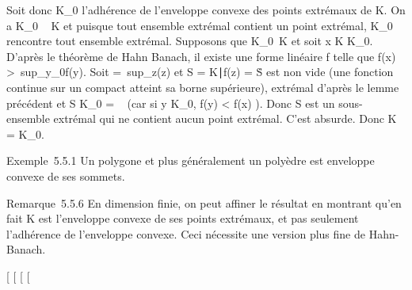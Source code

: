 \documentclass[]{article}
\begin{document}
Soit donc K_0 l'adhérence de l'enveloppe convexe des points
extrémaux de K. On a K_0 \subset~ K et puisque tout ensemble extrémal
contient un point extrémal, K_0 rencontre tout ensemble
extrémal. Supposons que K_0\neq~K et
soit x \in K \diagdown K_0. D'après le théorème de Hahn Banach, il existe
une forme linéaire f telle que f(x)
>\
sup_y\inK_0f(y). Soit \mu =\
sup_z\inKf(z) et S = \z \in
K∣f(z) = \mu\. S est non vide
(une fonction continue sur un compact atteint sa borne supérieure),
extrémal d'après le lemme précédent et S \bigcap K_0 = \varnothing~ (car si y \in
K_0, f(y) < f(x) \leq \mu). Donc S est un sous-ensemble
extrémal qui ne contient aucun point extrémal. C'est absurde. Donc K =
K_0.

Exemple~5.5.1 Un polygone et plus généralement un polyèdre est enveloppe
convexe de ses sommets.

Remarque~5.5.6 En dimension finie, on peut affiner le résultat en
montrant qu'en fait K est l'enveloppe convexe de ses points extrémaux,
et pas seulement l'adhérence de l'enveloppe convexe. Ceci nécessite une
version plus fine de Hahn-Banach.

[
[
[
[
\end{document}
